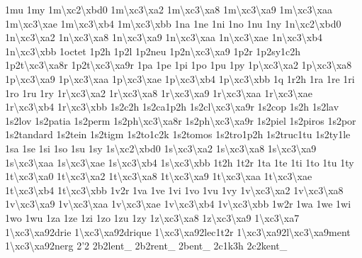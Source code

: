 {1mu 1my 1m\textbackslash{}xc2\textbackslash{}xbd0 1m\textbackslash{}xc3\textbackslash{}xa2 1m\textbackslash{}xc3\textbackslash{}xa8 1m\textbackslash{}xc3\textbackslash{}xa9 1m\textbackslash{}xc3\textbackslash{}xaa 1m\textbackslash{}xc3\textbackslash{}xae 1m\textbackslash{}xc3\textbackslash{}xb4 1m\textbackslash{}xc3\textbackslash{}xbb 1na 1ne 1ni 1no 1nu 1ny 1n\textbackslash{}xc2\textbackslash{}xbd0 1n\textbackslash{}xc3\textbackslash{}xa2 1n\textbackslash{}xc3\textbackslash{}xa8 1n\textbackslash{}xc3\textbackslash{}xa9 1n\textbackslash{}xc3\textbackslash{}xaa 1n\textbackslash{}xc3\textbackslash{}xae 1n\textbackslash{}xc3\textbackslash{}xb4 1n\textbackslash{}xc3\textbackslash{}xbb 1octet 1p2h 1p2l 1p2neu 1p2n\textbackslash{}xc3\textbackslash{}xa9 1p2r 1p2sy1c2h 1p2t\textbackslash{}xc3\textbackslash{}xa8r 1p2t\textbackslash{}xc3\textbackslash{}xa9r 1pa 1pe 1pi 1po 1pu 1py 1p\textbackslash{}xc3\textbackslash{}xa2 1p\textbackslash{}xc3\textbackslash{}xa8 1p\textbackslash{}xc3\textbackslash{}xa9 1p\textbackslash{}xc3\textbackslash{}xaa 1p\textbackslash{}xc3\textbackslash{}xae 1p\textbackslash{}xc3\textbackslash{}xb4 1p\textbackslash{}xc3\textbackslash{}xbb 1q 1r2h 1ra 1re 1ri 1ro 1ru 1ry 1r\textbackslash{}xc3\textbackslash{}xa2 1r\textbackslash{}xc3\textbackslash{}xa8 1r\textbackslash{}xc3\textbackslash{}xa9 1r\textbackslash{}xc3\textbackslash{}xaa 1r\textbackslash{}xc3\textbackslash{}xae 1r\textbackslash{}xc3\textbackslash{}xb4 1r\textbackslash{}xc3\textbackslash{}xbb 1s2c2h 1s2ca1p2h 1s2cl\textbackslash{}xc3\textbackslash{}xa9r 1s2cop 1s2h 1s2lav 1s2lov 1s2patia 1s2perm 1s2ph\textbackslash{}xc3\textbackslash{}xa8r 1s2ph\textbackslash{}xc3\textbackslash{}xa9r 1s2piel 1s2piros 1s2por 1s2tandard 1s2tein 1s2tigm 1s2to1c2k 1s2tomos 1s2tro1p2h 1s2truc1tu 1s2ty1le 1sa 1se 1si 1so 1su 1sy 1s\textbackslash{}xc2\textbackslash{}xbd0 1s\textbackslash{}xc3\textbackslash{}xa2 1s\textbackslash{}xc3\textbackslash{}xa8 1s\textbackslash{}xc3\textbackslash{}xa9 1s\textbackslash{}xc3\textbackslash{}xaa 1s\textbackslash{}xc3\textbackslash{}xae 1s\textbackslash{}xc3\textbackslash{}xb4 1s\textbackslash{}xc3\textbackslash{}xbb 1t2h 1t2r 1ta 1te 1ti 1to 1tu 1ty 1t\textbackslash{}xc3\textbackslash{}xa0 1t\textbackslash{}xc3\textbackslash{}xa2 1t\textbackslash{}xc3\textbackslash{}xa8 1t\textbackslash{}xc3\textbackslash{}xa9 1t\textbackslash{}xc3\textbackslash{}xaa 1t\textbackslash{}xc3\textbackslash{}xae 1t\textbackslash{}xc3\textbackslash{}xb4 1t\textbackslash{}xc3\textbackslash{}xbb 1v2r 1va 1ve 1vi 1vo 1vu 1vy 1v\textbackslash{}xc3\textbackslash{}xa2 1v\textbackslash{}xc3\textbackslash{}xa8 1v\textbackslash{}xc3\textbackslash{}xa9 1v\textbackslash{}xc3\textbackslash{}xaa 1v\textbackslash{}xc3\textbackslash{}xae 1v\textbackslash{}xc3\textbackslash{}xb4 1v\textbackslash{}xc3\textbackslash{}xbb 1w2r 1wa 1we 1wi 1wo 1wu 1za 1ze 1zi 1zo 1zu 1zy 1z\textbackslash{}xc3\textbackslash{}xa8 1z\textbackslash{}xc3\textbackslash{}xa9 1\textbackslash{}xc3\textbackslash{}xa7 1\textbackslash{}xc3\textbackslash{}xa92drie 1\textbackslash{}xc3\textbackslash{}xa92drique 1\textbackslash{}xc3\textbackslash{}xa92lec1t2r 1\textbackslash{}xc3\textbackslash{}xa92l\textbackslash{}xc3\textbackslash{}xa9ment 1\textbackslash{}xc3\textbackslash{}xa92nerg 2'2 2b2lent\-\_\- 2b2rent\-\_\- 2bent\-\_\- 2c1k3h 2c2kent\-\_\- }
